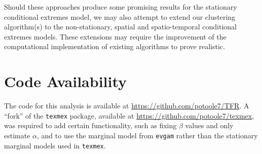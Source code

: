 \documentclass{article}
\numberwithin{equation}{section}
\begin{document}
Should these approaches produce some promising results for the stationary conditional extremes model, we may also attempt to extend our clustering algorithm(s) to the non-stationary, spatial and spatio-temporal conditional extremes models.
These extensions may require the improvement of the computational implementation of existing algorithms to prove realistic.

\section*{Code Availability}

The code for this analysis is available at \url{https://github.com/potoole7/TFR}.
A ``fork'' of the \texttt{texmex} package, available at \url{https://github.com/potoole7/texmex}, was required to add certain functionality, such as fixing $\beta$ values and only estimate $\alpha$, and to use the marginal model from \texttt{evgam} rather than the stationary marginal models used in \texttt{texmex}.


\newpage

\end{document}
